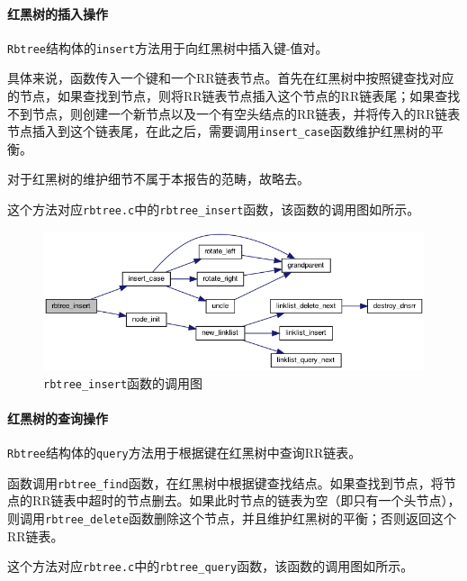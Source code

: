 \documentclass[lang=cn,11pt,a4paper,cite=authornum]{paper}
\begin{document}
\paragraph{红黑树的插入操作}

\texttt{Rbtree}结构体的\texttt{insert}方法用于向红黑树中插入键-值对。

具体来说，函数传入一个键和一个RR链表节点。首先在红黑树中按照键查找对应的节点，如果查找到节点，则将RR链表节点插入这个节点的RR链表尾；如果查找不到节点，则创建一个新节点以及一个有空头结点的RR链表，并将传入的RR链表节点插入到这个链表尾，在此之后，需要调用\texttt{insert_case}函数维护红黑树的平衡。

对于红黑树的维护细节不属于本报告的范畴，故略去。

这个方法对应\texttt{rbtree.c}中的\texttt{rbtree_insert}函数，该函数的调用图如所示。

\begin{figure}[htbp]

    \centering
    \includegraphics[width=0.8\linewidth]{./APIdoc/rbtree_8c_ae46c23eec5c1ea21ebab9279843de3a3_cgraph.png}
    \caption{\texttt{rbtree_insert}函数的调用图\label{fig:rbtree_insert_call}}

\end{figure}

\paragraph{红黑树的查询操作}

\texttt{Rbtree}结构体的\texttt{query}方法用于根据键在红黑树中查询RR链表。

函数调用\texttt{rbtree_find}函数，在红黑树中根据键查找结点。如果查找到节点，将节点的RR链表中超时的节点删去。如果此时节点的链表为空（即只有一个头节点），则调用\texttt{rbtree_delete}函数删除这个节点，并且维护红黑树的平衡；否则返回这个RR链表。

这个方法对应\texttt{rbtree.c}中的\texttt{rbtree_query}函数，该函数的调用图如所示。
\end{document}
